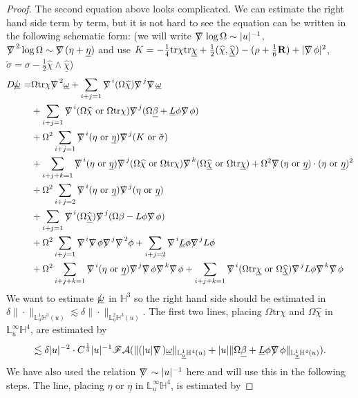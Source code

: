 \documentclass[11pt,reqno]{amsart}
\theoremstyle{definition}
\numberwithin{equation}{section}
\newcommand{\tr}{\mathrm{tr}}
\renewcommand{\L}{\mathbb{L}}
\renewcommand{\H}{\mathbb{H}}
\def\betab{\underline{\beta}}
\def\chib{\underline{\chi}}
\def\chibh{\widehat{\underline{\chi}}}
\def\chih{\widehat{\chi}}
\def\etab{\underline{\eta}}
\def\Lb{\underline{L}}
\def\tr{\mathrm{tr}}
\def\omegab{\underline{\omega}}
\def\ub{\underline{u}}
\def\nablas{\mbox{$\nabla \mkern -13mu /$ }}
\def\omegabs{\mbox{$\omegab \mkern -13mu /$ }}
\def\ds{\mbox{$\nabla \mkern -13mu /$ }}
\begin{document}
\begin{proof}
The second equation above looks complicated. We can estimate the right hand side term by term, but it is not hard to see the equation can be written in the following schematic form: (we will write $\nablas\log\Omega\sim|u|^{-1}$, $\nablas^2\log\Omega\sim\nablas(\eta+\etab)$ and use $K=-\frac{1}{4}\tr \chi\tr\chib+\frac{1}{2}(\chih,\chibh)-(\rho+\frac{1}{6}\mathbf{R})+|\ds\phi|^2$, $\check{\sigma}=\sigma-\frac{1}{2}\chih\wedge\chibh$)
\begin{equation}\label{equ-Domegabs-schematic}
\begin{split}
D\omegabs=&\Omega\tr\chi\nablas^2\omegab+\sum_{i+j=1}\nablas^i(\Omega\chih)\nablas^j\nablas\omegab\\
&+\sum_{i+j=1}\nablas^i(\Omega\chih\ \text{or}\ \Omega\tr\chi)\nablas^j(\Omega\betab+\Lb\phi\nablas\phi)\\
&+\Omega^2\sum_{i+j=1}\nablas^i(\eta\ \text{or}\ \etab)\nablas^j(K\ \text{or}\ \check{\sigma})\\
&+\sum_{i+j+k=1}\nablas^i(\eta\ \text{or}\ \etab)\nablas^j(\Omega\chih\ \text{or}\ \Omega\tr\chi)\nablas^k(\Omega\chibh\ \text{or}\ \Omega\tr\chib)+\Omega^2\nablas(\eta\ \text{or}\ \etab)\cdot(\eta\ \text{or}\ \etab)^2\\
&+\Omega^2\sum_{i+j=2}\nablas^i(\eta\ \text{or}\ \etab)\nablas^j(\eta\ \text{or}\ \etab)\\
&+\sum_{i+j=1}\nablas^i(\Omega\chibh)\nablas^j(\Omega\beta-L\phi\nablas\phi)\\
&+\Omega^2\sum_{i+j=1}\nablas^i\nablas\phi\nablas^j\nablas^2\phi+\sum_{i+j=2}\nablas^i\Lb\phi\nablas^jL\phi\\
&+\Omega^2\sum_{i+j+k=1}\nablas^i(\eta\ \text{or}\ \etab)\nablas^j\nablas\phi\nablas^k\nablas\phi+\sum_{i+j+k=1}\nablas^i(\Omega\tr\chib\ \text{or}\ \Omega\chibh)\nablas^jL\phi\nablas^k\nablas\phi
\end{split}
\end{equation}
We want to estimate $\omegabs$ in $\H^3$ so the right hand side should be estimated in $\delta\|\cdot\|_{\L^1_{\ub}\H^3(u)}\lesssim\delta\|\cdot\|_{\L^2_{\ub}\H^3(u)}$. The first two lines, placing $\Omega\tr\chi$ and $\Omega\chih$ in $\L^\infty_{\ub}\H^4$,  are estimated by
\begin{align*}
\lesssim\delta|u|^{-2}\cdot C^{\frac{1}{4}}|u|^{-1}\mathscr{F}\mathcal{A}(\|(|u|\nablas)\omegab\|_{\L^1_{\ub}\H^4(u)}+|u|\|\Omega\betab+\Lb\phi\nablas\phi\|_{\L^1_{\ub}\H^4(u)}).
\end{align*}
We have also used the relation $\nablas\sim|u|^{-1}$ here and will use this in the following steps. The  line, placing $\eta$ or $\etab$ in $\L^\infty_{\ub}\H^4$, is estimated by

\end{proof}
\end{document}
